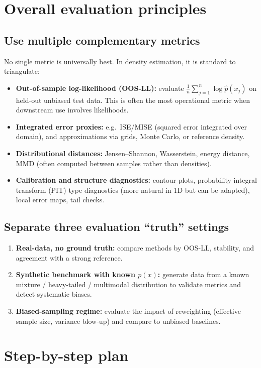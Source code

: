 \documentclass[twocolumn]{notes}
\begin{document}
\section{Overall evaluation principles}

\subsection{Use multiple complementary metrics}
No single metric is universally best. In density estimation, it is standard to triangulate:
\begin{itemize}[leftmargin=2em]
\item \textbf{Out-of-sample log-likelihood (OOS-LL):} evaluate $\frac{1}{n}\sum_{j=1}^n \log \hat p(x_j)$ on held-out unbiased test data. This is often the most operational metric when downstream use involves likelihoods.
\item \textbf{Integrated error proxies:} e.g.\ ISE/MISE (squared error integrated over domain), and approximations via grids, Monte Carlo, or reference density.
\item \textbf{Distributional distances:} Jensen--Shannon, Wasserstein, energy distance, MMD (often computed between samples rather than densities).
\item \textbf{Calibration and structure diagnostics:} contour plots, probability integral transform (PIT) type diagnostics (more natural in 1D but can be adapted), local error maps, tail checks.
\end{itemize}

\subsection{Separate three evaluation ``truth'' settings}
\begin{enumerate}[leftmargin=2em]
\item \textbf{Real-data, no ground truth:} compare methods by OOS-LL, stability, and agreement with a strong reference.
\item \textbf{Synthetic benchmark with known $p(x)$:} generate data from a known mixture / heavy-tailed / multimodal distribution to validate metrics and detect systematic biases.
\item \textbf{Biased-sampling regime:} evaluate the impact of reweighting (effective sample size, variance blow-up) and compare to unbiased baselines.
\end{enumerate}

\section{Step-by-step plan}
\end{document}
